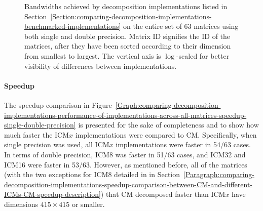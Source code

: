\begin{figure}[ht!]
\begin{subfigure}{\textwidth}
		\label{Graph:comparing-decomposition-implementations-performance-of-implementations-across-all-matrices-bandwidth-double-precision}
	\end{subfigure}
	\caption{Bandwidths achieved by decomposition implementations listed in Section~\ref{Section:comparing-decomposition-implementations-benchmarked-implementations} on the entire set of 63 matrices using both single and double precision. Matrix ID signifies the ID of the matrices, after they have been sorted according to their dimension from smallest to largest. The vertical axis is $ \log $-scaled for better visibility of differences between implementations.}
	\label{Graph:comparing-decomposition-implementations-performance-of-implementations-across-all-matrices-bandwidth-single-double-precision}
\end{figure}

\paragraph{Speedup} The speedup comparison in Figure~\ref{Graph:comparing-decomposition-implementations-performance-of-implementations-across-all-matrices-speedup-single-double-precision} is presented for the sake of completeness and to show how much faster the ICM$ x $ implementations were compared to CM. Specifically, when single precision was used, all ICM$ x $ implementations were faster in 54/63 cases. In terms of double precision, ICM8 was faster in 51/63 cases, and ICM32 and ICM16 were faster in 53/63. However, as mentioned before, all of the matrices (with the two exceptions for ICM8 detailed in \textit{} in Section~\ref{Paragraph:comparing-decomposition-implementations-speedup-comparison-between-CM-and-different-ICMs-CM-speedup-description}) that CM decomposed faster than ICM$ x $ have dimensions $ 415\times 415 $ or smaller.

